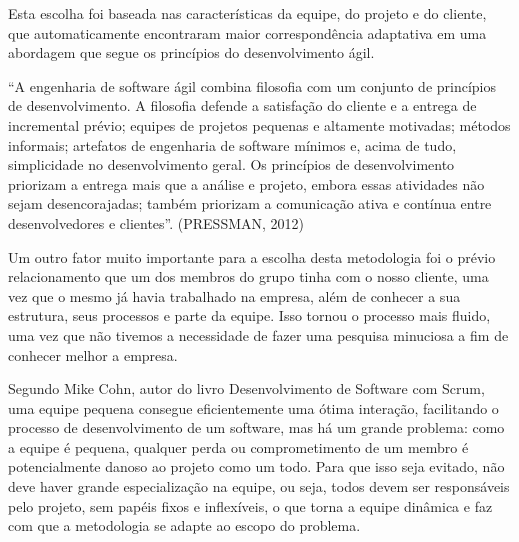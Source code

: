 Esta escolha foi baseada nas características da equipe, do projeto e do cliente, que automaticamente encontraram maior correspondência adaptativa em uma abordagem que segue os princípios do desenvolvimento ágil.

“A engenharia de software ágil combina filosofia com um conjunto de princípios de desenvolvimento. A filosofia defende a satisfação do cliente e a entrega de incremental prévio; equipes de projetos pequenas e altamente motivadas; métodos informais; artefatos de engenharia de software mínimos e, acima de tudo, simplicidade no desenvolvimento geral. Os princípios de desenvolvimento priorizam a entrega mais que a análise e projeto, embora essas atividades não sejam desencorajadas; também priorizam a comunicação ativa e contínua entre desenvolvedores e clientes”. (PRESSMAN, 2012)

Um outro fator muito importante para a escolha desta metodologia foi o prévio relacionamento que um dos membros do grupo tinha com o nosso cliente, uma vez que o mesmo já havia trabalhado na empresa, além de conhecer a sua estrutura, seus processos e parte da equipe. Isso tornou o processo mais fluido, uma vez que não tivemos a necessidade de fazer uma pesquisa minuciosa a fim de conhecer melhor a empresa.

Segundo Mike Cohn, autor do livro Desenvolvimento de Software com Scrum, uma equipe pequena consegue eficientemente uma ótima interação, facilitando o processo de desenvolvimento de um software, mas há um grande problema: como a equipe é pequena, qualquer perda ou comprometimento de um membro é potencialmente danoso ao projeto como um todo. Para que isso seja evitado, não deve haver grande especialização na equipe, ou seja, todos devem ser responsáveis pelo projeto, sem papéis fixos e inflexíveis, o que torna a equipe dinâmica e faz com que a metodologia se adapte ao escopo do problema.
